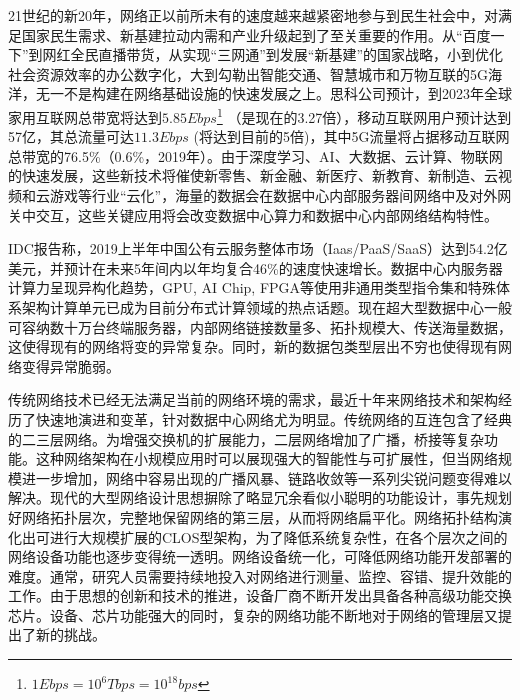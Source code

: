 




21世纪的新20年，网络正以前所未有的速度越来越紧密地参与到民生社会中，对满足国家民生需求、新基建拉动内需和产业升级起到了至关重要的作用。从“百度一下”到网红全民直播带货，从实现“三网通”到发展“新基建”的国家战略，小到优化社会资源效率的办公数字化，大到勾勒出智能交通、智慧城市和万物互联的5G海洋，无一不是构建在网络基础设施的快速发展之上。思科公司预计，到2023年全球家用互联网总带宽将达到$5.85Ebps$\footnote{$1 Ebps=10^6Tbps=10^{18}bps$} （是现在的3.27倍），移动互联网用户预计达到57亿，其总流量可达$11.3Ebps$ (将达到目前的5倍)，其中5G流量将占据移动互联网总带宽的76.5\%（0.6\%，2019年）。由于深度学习、AI、大数据、云计算、物联网的快速发展，这些新技术将催使新零售、新金融、新医疗、新教育、新制造、云视频和云游戏等行业“云化”，海量的数据会在数据中心内部服务器间网络中及对外网关中交互，这些关键应用将会改变数据中心算力和数据中心内部网络结构特性。

IDC报告称，2019上半年中国公有云服务整体市场（Iaas/PaaS/SaaS）达到54.2亿美元，并预计在未来5年间内以年均复合46\%的速度快速增长。数据中心内服务器计算力呈现异构化趋势，GPU, AI Chip, FPGA等使用非通用类型指令集和特殊体系架构计算单元已成为目前分布式计算领域的热点话题。现在超大型数据中心一般可容纳数十万台终端服务器，内部网络链接数量多、拓扑规模大、传送海量数据，这使得现有的网络将变的异常复杂。同时，新的数据包类型层出不穷也使得现有网络变得异常脆弱。

传统网络技术已经无法满足当前的网络环境的需求，最近十年来网络技术和架构经历了快速地演进和变革，针对数据中心网络尤为明显。传统网络的互连包含了经典的二三层网络。为增强交换机的扩展能力，二层网络增加了广播，桥接等复杂功能。这种网络架构在小规模应用时可以展现强大的智能性与可扩展性，但当网络规模进一步增加，网络中容易出现的广播风暴、链路收敛等一系列尖锐问题变得难以解决。现代的大型网络设计思想摒除了略显冗余看似小聪明的功能设计，事先规划好网络拓扑层次，完整地保留网络的第三层，从而将网络扁平化。网络拓扑结构演化出可进行大规模扩展的CLOS型架构，为了降低系统复杂性，在各个层次之间的网络设备功能也逐步变得统一透明。网络设备统一化，可降低网络功能开发部署的难度。通常，研究人员需要持续地投入对网络进行测量、监控、容错、提升效能的工作。由于思想的创新和技术的推进，设备厂商不断开发出具备各种高级功能交换芯片。设备、芯片功能强大的同时，复杂的网络功能不断地对于网络的管理层又提出了新的挑战。

